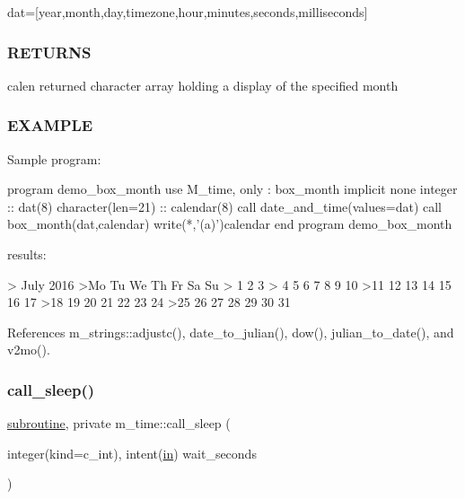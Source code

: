 dat=\mbox{[}year,month,day,timezone,hour,minutes,seconds,milliseconds\mbox{]} \subsubsection*{R\+E\+T\+U\+R\+NS}

calen returned character array holding a display of the specified month

\subsubsection*{E\+X\+A\+M\+P\+LE}

\begin{DoxyVerb}Sample program:

 program demo_box_month
 use M_time, only : box_month
 implicit none
 integer           :: dat(8)
 character(len=21) :: calendar(8)
    call date_and_time(values=dat)
    call box_month(dat,calendar)
    write(*,'(a)')calendar
 end program demo_box_month

results:

  >     July 2016
  >Mo Tu We Th Fr Sa Su
  >             1  2  3
  > 4  5  6  7  8  9 10
  >11 12 13 14 15 16 17
  >18 19 20 21 22 23 24
  >25 26 27 28 29 30 31 \end{DoxyVerb}
 

References m\+\_\+strings\+::adjustc(), date\+\_\+to\+\_\+julian(), dow(), julian\+\_\+to\+\_\+date(), and v2mo().

\mbox{\label{namespacem__time_af558bfc1fd5b13a6b879b3969866956f}} 
\subsubsection{\texorpdfstring{call\+\_\+sleep()}{call\_sleep()}}
{\footnotesize\ttfamily \hyperlink{M__stopwatch_83_8txt_acfbcff50169d691ff02d4a123ed70482}{subroutine}, private m\+\_\+time\+::call\+\_\+sleep (\begin{DoxyParamCaption}\item[{integer(kind=c\+\_\+int), intent(\hyperlink{M__journal_83_8txt_afce72651d1eed785a2132bee863b2f38}{in})}]{wait\+\_\+seconds }\end{DoxyParamCaption})\hspace{0.3cm}{\ttfamily [private]}}



